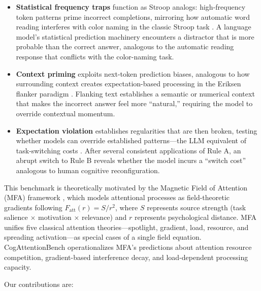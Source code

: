 \documentclass{article}
\begin{document}
\begin{itemize}
    \item \textbf{Statistical frequency traps} function as Stroop analogs: high-frequency token patterns prime incorrect completions, mirroring how automatic word reading interferes with color naming in the classic Stroop task \citep{stroop1935}. A language model's statistical prediction machinery encounters a distractor that is more probable than the correct answer, analogous to the automatic reading response that conflicts with the color-naming task.
    \item \textbf{Context priming} exploits next-token prediction biases, analogous to how surrounding context creates expectation-based processing in the Eriksen flanker paradigm \citep{eriksen1974}. Flanking text establishes a semantic or numerical context that makes the incorrect answer feel more ``natural,'' requiring the model to override contextual momentum.
    \item \textbf{Expectation violation} establishes regularities that are then broken, testing whether models can override established patterns---the LLM equivalent of task-switching costs \citep{rogers1995}. After several consistent applications of Rule A, an abrupt switch to Rule B reveals whether the model incurs a ``switch cost'' analogous to human cognitive reconfiguration.
\end{itemize}

This benchmark is theoretically motivated by the Magnetic Field of Attention (MFA) framework \citep{zeng2026}, which models attentional processes as field-theoretic gradients following $F_{\mathrm{att}}(r) = S/r^2$, where $S$ represents source strength (task salience $\times$ motivation $\times$ relevance) and $r$ represents psychological distance. MFA unifies five classical attention theories---spotlight, gradient, load, resource, and spreading activation---as special cases of a single field equation. CogAttentionBench operationalizes MFA's predictions about attention resource competition, gradient-based interference decay, and load-dependent processing capacity.

Our contributions are:
\end{document}
